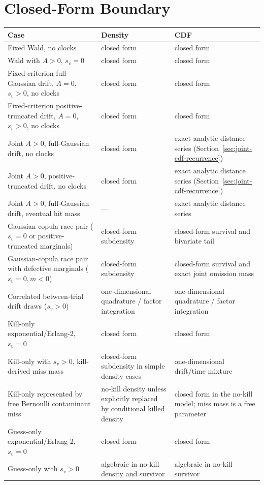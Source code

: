 \documentclass[12pt]{article}
\begin{document}
\section{Closed-Form Boundary}
\begin{center}
\footnotesize
\begin{tabular}{p{}p{}p{}}
\toprule
Case & Density & CDF \\
\midrule
Fixed Wald, no clocks & closed form & closed form \\
Wald with $A>0$, $s_v=0$ & closed form & closed form \\
Fixed-criterion full-Gaussian drift, $A=0$, $s_v>0$, no clocks & closed form & closed form \\
Fixed-criterion positive-truncated drift, $A=0$, $s_v>0$, no clocks & closed form & closed form \\
Joint $A>0$, full-Gaussian drift, no clocks & closed form & exact analytic distance series (Section~\ref{sec:joint-cdf-recurrence}) \\
Joint $A>0$, positive-truncated drift, no clocks & closed form & exact analytic distance series (Section~\ref{sec:joint-cdf-recurrence}) \\
Joint $A>0$, full-Gaussian drift, eventual hit mass & --- & exact analytic distance series \\
Gaussian-copula race pair ($s_v=0$ or positive-truncated marginals) & closed-form subdensity & closed-form survival and bivariate tail \\
Gaussian-copula race pair with defective marginals ($s_v=0, m<0$) & closed-form subdensity & closed-form survival and exact joint omission mass \\
Correlated between-trial drift draws ($s_v>0$) & one-dimensional quadrature / factor integration & one-dimensional quadrature / factor integration \\
Kill-only exponential/Erlang-2, $s_v=0$ & closed form & closed form \\
Kill-only with $s_v>0$, kill-derived miss mass & closed-form subdensity in simple density cases & one-dimensional drift/time mixture \\
Kill-only represented by free Bernoulli contaminant miss & no-kill density unless explicitly replaced by conditional killed density & closed form in the no-kill model; miss mass is a free parameter \\
Guess-only exponential/Erlang-2, $s_v=0$ & closed form & closed form \\
Guess-only with $s_v>0$ & algebraic in no-kill density and survivor & algebraic in no-kill survivor \\

\end{tabular}
\end{center}
\end{document}
